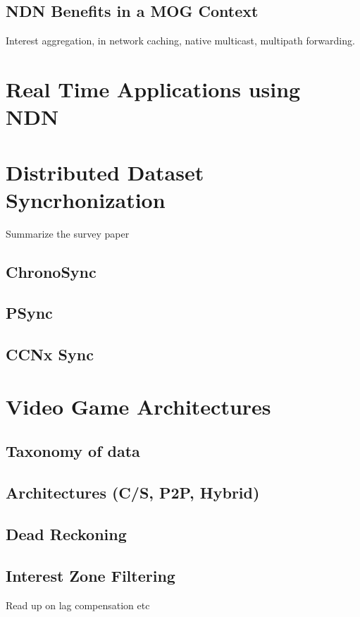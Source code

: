 \subsection{NDN Benefits in a MOG Context}
Interest aggregation, in network caching, native multicast, multipath forwarding.


\section{Real Time Applications using NDN}

\section{Distributed Dataset Syncrhonization}
Summarize the survey paper
\subsection{ChronoSync}
\subsection{PSync}
\subsection{CCNx Sync}

\section{Video Game Architectures}
\subsection{Taxonomy of data}
\subsection{Architectures (C/S, P2P, Hybrid)}
\subsection{Dead Reckoning}
\subsection{Interest Zone Filtering}

Read up on lag compensation etc


